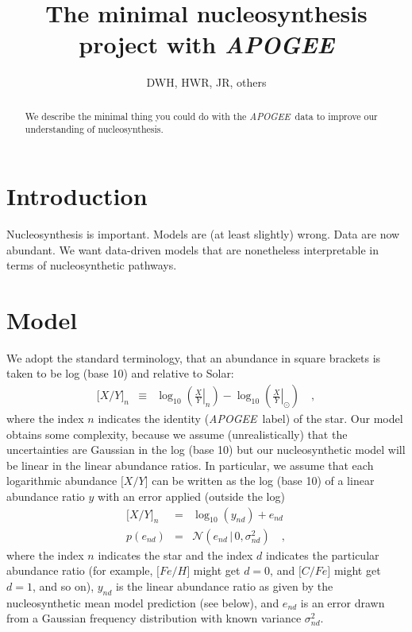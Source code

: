 \documentclass[12pt, preprint]{aastex}
\newcommand{\acronym}[1]{{\small{#1}}}
\newcommand{\project}[1]{\textsl{#1}}
\newcommand{\apogee}{\project{\acronym{APOGEE}}}
\newcommand{\solar}{\odot}
\newcommand{\abundance}[1]{\lbrack{#1}\rbrack}
\newcommand{\given}{\,|\,}
\newcommand{\normal}{\mathcal{N}}
\begin{document}
\title{The minimal nucleosynthesis project with \apogee}
\author{DWH, HWR, JR, others}

\begin{abstract}
We describe the minimal thing you could do with the \apogee\ data to
improve our understanding of nucleosynthesis.
\end{abstract}


\section{Introduction}

Nucleosynthesis is important.  Models are (at least slightly) wrong.
Data are now abundant.  We want data-driven models that are
nonetheless interpretable in terms of nucleosynthetic pathways.

\section{Model}

We adopt the standard terminology, that an abundance in square brackets
is taken to be log (base 10) and relative to Solar:
\begin{eqnarray}
  \abundance{X/Y}_n &\equiv& \log_{10}\left(\left.\frac{X}{Y}\right|_n\right) -
                             \log_{10}\left(\left.\frac{X}{Y}\right|_\solar\right)
\quad ,
\end{eqnarray}
where the index $n$ indicates the identity (\apogee\ label) of the star.
Our model obtains some complexity, because we assume (unrealistically)
that the uncertainties are Gaussian in the log (base 10) but our
nucleosynthetic model will be linear in the linear abundance ratios.
In particular, we assume that each logarithmic abundance $\abundance{X/Y}$
can be written as the log (base 10) of a linear abundance ratio $y$ with
an error applied (outside the log)
\begin{eqnarray}
  \abundance{X/Y}_n &=& \log_{10}(y_{nd}) + e_{nd} \label{eq:model1}
\\
  p(e_{nd}) &=& \normal(e_{nd}\given 0,\sigma^2_{nd}) \label{eq:model2}
\quad ,
\end{eqnarray}
where the index $n$ indicates the star and the index $d$ indicates the
particular abundance ratio (for example, $\abundance{Fe/H}$ might get
$d=0$, and $\abundance{C/Fe}$ might get $d=1$, and so on), $y_{nd}$ is
the linear abundance ratio as given by the nucleosynthetic mean model
prediction (see below), and $e_{nd}$ is an error drawn from a Gaussian
frequency distribution with known variance $\sigma^2_{nd}$.
\end{document}
